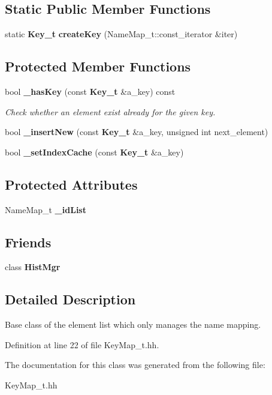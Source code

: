 \subsection*{Static Public Member Functions}
\begin{DoxyCompactItemize}
\item 
static {\bf Key\_\-t} {\bfseries createKey} (NameMap\_\-t::const\_\-iterator \&iter)\label{classhistmgr_1_1KeyMapBase__t_a0abfc2a6b98414d55e92a0c9c69b4b29}

\end{DoxyCompactItemize}
\subsection*{Protected Member Functions}
\begin{DoxyCompactItemize}
\item 
bool {\bf \_\-hasKey} (const {\bf Key\_\-t} \&a\_\-key) const \label{classhistmgr_1_1KeyMapBase__t_aed1d4e8444789c2f0089bec2b68a091b}

\begin{DoxyCompactList}\small\item\em Check whether an element exist already for the given key. \item\end{DoxyCompactList}\item 
bool {\bfseries \_\-insertNew} (const {\bf Key\_\-t} \&a\_\-key, unsigned int next\_\-element)\label{classhistmgr_1_1KeyMapBase__t_a8c886c4d400a0549978b170ddd846d1e}

\item 
bool {\bfseries \_\-setIndexCache} (const {\bf Key\_\-t} \&a\_\-key)\label{classhistmgr_1_1KeyMapBase__t_a51614c13e31ea6616cefd41580c92288}

\end{DoxyCompactItemize}
\subsection*{Protected Attributes}
\begin{DoxyCompactItemize}
\item 
NameMap\_\-t {\bfseries \_\-idList}\label{classhistmgr_1_1KeyMapBase__t_a759b7cd45f2bff8c5c5c83954c3f1295}

\end{DoxyCompactItemize}
\subsection*{Friends}
\begin{DoxyCompactItemize}
\item 
class {\bfseries HistMgr}\label{classhistmgr_1_1KeyMapBase__t_a3cc85db784d7651390e41024125eb3a0}

\end{DoxyCompactItemize}


\subsection{Detailed Description}
Base class of the element list which only manages the name mapping. 

Definition at line 22 of file KeyMap\_\-t.hh.

The documentation for this class was generated from the following file:\begin{DoxyCompactItemize}
\item 
KeyMap\_\-t.hh\end{DoxyCompactItemize}
